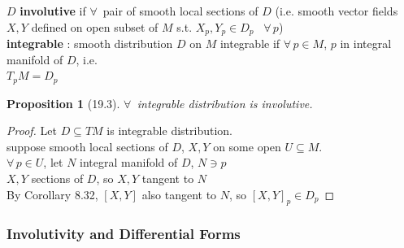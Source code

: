 \documentclass[11pt]{amsart}
\newtheorem{proposition}{Proposition}
\theoremstyle{definition}
\begin{document}
$D$ \textbf{involutive} if $\forall \, $ pair of smooth local sections of $D$ (i.e. smooth vector fields $X,Y$ defined on open subset of $M$ s.t. $X_p, Y_p \in D_p$ \, $\forall \, p$) \\

\textbf{integrable} : smooth distribution $D$ on $M$ integrable if $\forall \, p \in M$, $p$ in integral manifold of $D$, i.e. \\
\phantom{\quad \quad \, } $T_p M = D_p$

\begin{proposition}[19.3] $\forall \, $ integrable distribution is involutive. \end{proposition}

\begin{proof} Let $D \subseteq TM$ is integrable distribution. \\
suppose smooth local sections of $D$, $X,Y$ on some open $U\subseteq M$. \\
$\forall \, p \in U$, let $N$ integral manifold of $D$, $N \ni p$ \\
$X,Y$ sections of $D$, so $X,Y$ tangent to $N$ \\
By Corollary 8.32, $[X,Y]$ also tangent to $N$, so $[X,Y]_p \in D_p$
\end{proof}



\subsubsection*{Involutivity and Differential Forms}
\end{document}
